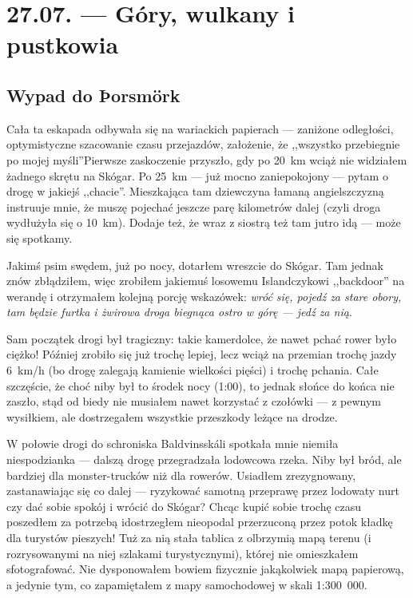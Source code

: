 \chapter*{27.07. --- Góry, wulkany i pustkowia}

\section*{Wypad do Þorsmörk}

Cała ta eskapada odbywała się na wariackich papierach --- zaniżone odległości, optymistyczne szacowanie czasu przejazdów, założenie, że ,,wszystko przebiegnie po mojej myśli''\textellipsis Pierwsze zaskoczenie przyszło, gdy po 20~km wciąż nie widziałem żadnego skrętu na Skógar. Po 25~km --- już mocno zaniepokojony --- pytam o drogę w jakiejś ,,chacie''. Mieszkająca tam dziewczyna łamaną angielszczyzną instruuje mnie, że muszę pojechać jeszcze parę kilometrów dalej (czyli droga wydłużyła się o 10~km). Dodaje też, że wraz z siostrą też tam jutro idą --- może się spotkamy.

Jakimś psim swędem, już po nocy, dotarłem wreszcie do Skógar. Tam jednak znów zbłądziłem, więc zrobiłem jakiemuś losowemu Islandczykowi ,,backdoor'' na werandę i otrzymałem kolejną porcję wskazówek: \emph{wróć się, pojedź za stare obory, tam będzie furtka i żwirowa droga biegnąca ostro w górę --- jedź za nią}.

Sam początek drogi był tragiczny: takie kamerdolce, że nawet pchać rower było ciężko! Później zrobiło się już trochę lepiej, lecz wciąż na przemian trochę jazdy 6~km/h (bo drogę zalegają kamienie wielkości pięści) i trochę pchania. Całe szczęście, że choć niby był to środek nocy (1:00), to jednak słońce do końca nie zaszło, stąd od biedy nie musiałem nawet korzystać z czołówki --- z pewnym wysiłkiem, ale dostrzegałem wszystkie przeszkody leżące na drodze.

W połowie drogi do schroniska Baldvinsskáli spotkała mnie niemiła niespodzianka --- dalszą drogę przegradzała lodowcowa rzeka. Niby był bród, ale bardziej dla monster-truc\-ków niż dla rowerów. Usiadłem zrezygnowany, zastanawiając się co dalej --- ryzykować samotną przeprawę przez lodowaty nurt czy dać sobie spokój i wrócić do Skógar? Chcąc kupić sobie trochę czasu poszedłem za potrzebą i\textellipsis dostrzegłem nieopodal przerzuconą przez potok kładkę dla turystów pieszych! Tuż za nią stała tablica z olbrzymią mapą terenu (i rozrysowanymi na niej szlakami turystycznymi), której nie omieszkałem sfotografować. Nie dysponowałem bowiem fizycznie jakąkolwiek mapą papierową, a jedynie tym, co zapamiętałem z mapy samochodowej w skali  1:300~000.

